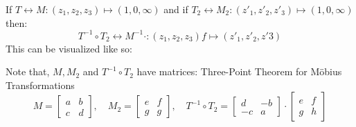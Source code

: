 \documentclass[10pt]{article}
\begin{document}
        \begin{theorembox}
            If $T \longleftrightarrow M : (z_1, z_2, z_3) \mapsto (1,0,\infty)$ and if $T_2 \longleftrightarrow M_2: (z'_1, z'_2, z'_3) \mapsto (1,0,\infty)$ then:
            $$T^{-1} \circ T_2 \longleftrightarrow M^{-1} \cdot: (z_1, z_2, z_3) f\mapsto (z'_1, z'_2, z'3) $$
            This can be visualized like so:
            \begin{center}
            \end{center}
            Note that, $M, M_2$ and $T^{-1}\circ T_2$ have matrices: Three-Point Theorem for Möbius Transformations
            \footnotesize$$M = \begin{bmatrix} a&b \\ c &d \end{bmatrix}, \quad M_2 = \begin{bmatrix} e&f \\ g &g \end{bmatrix}, \quad T^{-1} \circ T_2 =  \begin{bmatrix} d&-b \\ -c &a \end{bmatrix} \cdot \begin{bmatrix}e & f \\ g & h\end{bmatrix}$$
        \end{theorembox}
        
\end{document}
